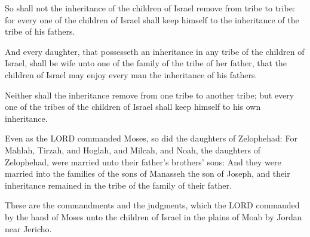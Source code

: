 \Verse So shall not the inheritance of the children of Israel remove
from tribe to tribe: for every one of the children of Israel shall
keep himself to the inheritance of the tribe of his fathers.

\Verse And every daughter, that possesseth an inheritance in any tribe
of the children of Israel, shall be wife unto one of the family of the
tribe of her father, that the children of Israel may enjoy every man
the inheritance of his fathers.

\Verse Neither shall the inheritance remove from one tribe to another
tribe; but every one of the tribes of the children of Israel shall
keep himself to his own inheritance.

\Verse Even as the LORD commanded Moses, so did the daughters of
Zelophehad: \Verse For Mahlah, Tirzah, and Hoglah, and Milcah, and
Noah, the daughters of Zelophehad, were married unto their father's
brothers' sons: \Verse And they were married into the families of the
sons of Manasseh the son of Joseph, and their inheritance remained in
the tribe of the family of their father.

\Verse These are the commandments and the judgments, which the LORD
commanded by the hand of Moses unto the children of Israel in the
plains of Moab by Jordan near Jericho.

